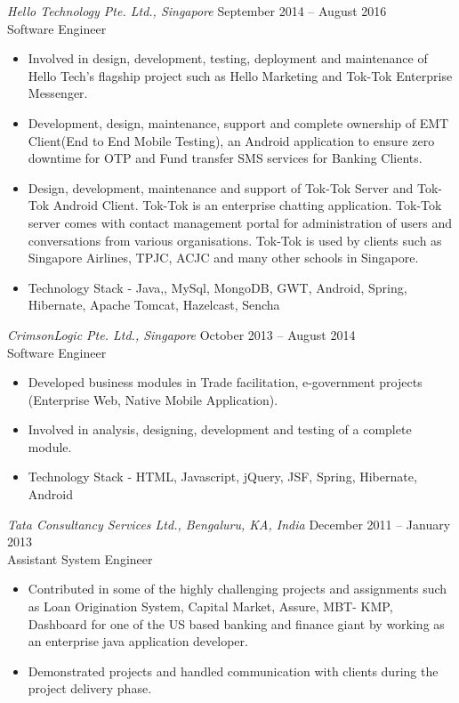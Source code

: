\documentclass[10pt]{res} %
\begin{document}
\begin{resume}
{\sl Hello Technology Pte. Ltd., Singapore} \hfill September 2014 -- August 2016 \\
Software Engineer \hfill 
\begin{itemize} \itemsep -2pt %
\item Involved in design, development, testing, deployment and maintenance of Hello Tech's flagship project such as Hello Marketing and Tok-Tok Enterprise Messenger.
\item Development, design, maintenance, support and complete ownership of EMT Client(End to End Mobile Testing), an Android application to ensure zero downtime for OTP and Fund transfer SMS services for Banking Clients.
\item Design, development, maintenance and support of Tok-Tok Server and Tok-Tok Android Client. Tok-Tok is an enterprise chatting application. Tok-Tok server comes with contact management portal  for administration of users and conversations from various organisations. Tok-Tok is used by clients such as Singapore Airlines, TPJC, ACJC and many other schools in Singapore.
\item Technology Stack - Java,, MySql, MongoDB, GWT, Android, Spring, Hibernate, Apache Tomcat, Hazelcast, Sencha
\end{itemize}

{\sl CrimsonLogic Pte. Ltd., Singapore} \hfill October 2013 -- August 2014 \\
Software Engineer  \hfill
\begin{itemize} \itemsep -2pt %
\item Developed business modules in  Trade facilitation, e-government  projects (Enterprise Web, Native Mobile Application).
\item Involved in analysis, designing, development and testing of a complete module.
\item Technology Stack - HTML, Javascript, jQuery, JSF, Spring, Hibernate, Android
\end{itemize}
 

{\sl Tata Consultancy Services Ltd., Bengaluru, KA, India} \hfill December 2011 -- January 2013 \\
Assistant System Engineer \hfill
\begin{itemize} \itemsep -2pt %
\item Contributed in some of the highly challenging projects and  assignments such as  Loan Origination System, Capital Market, Assure, MBT-
KMP, Dashboard for one of the US based banking and finance giant by working as an enterprise java application developer.
\item Demonstrated projects and handled communication with clients during the project delivery phase.
\end{itemize}


\end{resume}
\end{document}
